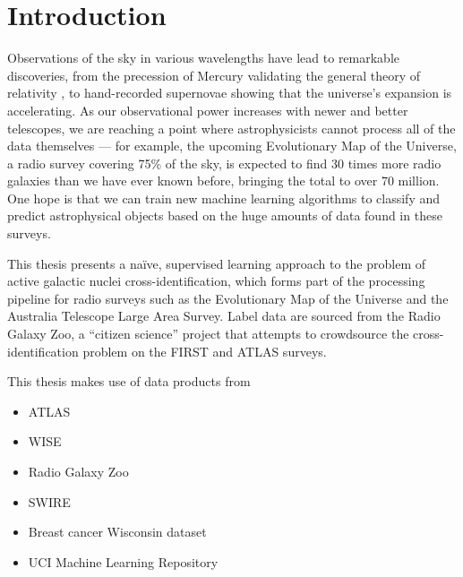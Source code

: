 
\chapter{Introduction}
\label{cha:intro}

Observations of the sky in various wavelengths have lead to remarkable discoveries, from the precession of Mercury validating the general theory of relativity , to hand-recorded supernovae showing that the universe's expansion is accelerating. As our observational power increases with newer and better telescopes, we are reaching a point where astrophysicists cannot process all of the data themselves --- for example, the upcoming Evolutionary Map of the Universe, a radio survey covering 75\% of the sky, is expected to find 30 times more radio galaxies than we have ever known before, bringing the total to over 70 million. One hope is that we can train new machine learning algorithms to classify and predict astrophysical objects based on the huge amounts of data found in these surveys.

This thesis presents a na\"ive, supervised learning approach to the problem of active galactic nuclei cross-identification, which forms part of the processing pipeline for radio surveys such as the Evolutionary Map of the Universe and the Australia Telescope Large Area Survey. Label data are sourced from the Radio Galaxy Zoo, a ``citizen science'' project that attempts to crowdsource the cross-identification problem on the FIRST and ATLAS surveys.


This thesis makes use of data products from
\begin{itemize}
    \item ATLAS
    \item WISE
    \item Radio Galaxy Zoo
    \item SWIRE
    \item Breast cancer Wisconsin dataset
    \item UCI Machine Learning Repository
\end{itemize}